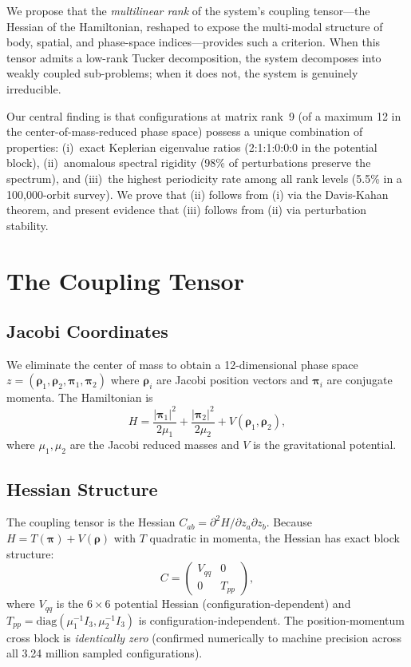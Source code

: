 \documentclass[aps,pre,twocolumn,superscriptaddress,floatfix]{revtex4-2}
\begin{document}
We propose that the \emph{multilinear rank} of the system's coupling
tensor---the Hessian of the Hamiltonian, reshaped to expose the
multi-modal structure of body, spatial, and phase-space indices---provides
such a criterion. When this tensor admits a low-rank Tucker decomposition,
the system decomposes into weakly coupled sub-problems; when it does not,
the system is genuinely irreducible.

Our central finding is that configurations at matrix rank~9 (of a
maximum 12 in the center-of-mass-reduced phase space) possess a
unique combination of properties: (i)~exact Keplerian eigenvalue ratios
(2:1:1:0:0:0 in the potential block), (ii)~anomalous spectral rigidity
(98\% of perturbations preserve the spectrum), and (iii)~the highest
periodicity rate among all rank levels (5.5\% in a 100,000-orbit survey).
We prove that (ii) follows from (i) via the Davis-Kahan theorem, and
present evidence that (iii) follows from (ii) via perturbation stability.

\section{The Coupling Tensor}

\subsection{Jacobi Coordinates}

We eliminate the center of mass to obtain a 12-dimensional phase space
$z = (\boldsymbol{\rho}_1, \boldsymbol{\rho}_2, \boldsymbol{\pi}_1,
\boldsymbol{\pi}_2)$ where $\boldsymbol{\rho}_i$ are Jacobi position
vectors and $\boldsymbol{\pi}_i$ are conjugate momenta. The Hamiltonian is
\begin{equation}
H = \frac{|\boldsymbol{\pi}_1|^2}{2\mu_1}
  + \frac{|\boldsymbol{\pi}_2|^2}{2\mu_2} + V(\boldsymbol{\rho}_1, \boldsymbol{\rho}_2),
\end{equation}
where $\mu_1, \mu_2$ are the Jacobi reduced masses and $V$ is the
gravitational potential.

\subsection{Hessian Structure}

The coupling tensor is the Hessian $C_{ab} = \partial^2 H / \partial z_a \partial z_b$.
Because $H = T(\boldsymbol{\pi}) + V(\boldsymbol{\rho})$ with $T$ quadratic
in momenta, the Hessian has exact block structure:
\begin{equation}
C = \begin{pmatrix} V_{qq} & 0 \\ 0 & T_{pp} \end{pmatrix},
\label{eq:block}
\end{equation}
where $V_{qq}$ is the $6 \times 6$ potential Hessian (configuration-dependent)
and $T_{pp} = \text{diag}(\mu_1^{-1} I_3, \mu_2^{-1} I_3)$ is
configuration-independent. The position-momentum cross block is
\emph{identically zero} (confirmed numerically to machine precision
across all 3.24 million sampled configurations).
\end{document}
